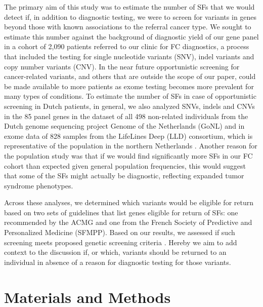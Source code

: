 The primary aim of this study was to estimate the number of SFs that we would detect if, in addition to diagnostic testing, we were to screen for variants in genes beyond those with known associations to the referral cancer type. 
We sought to estimate this number against the background of diagnostic yield of our gene panel in a cohort of 2,090 patients referred to our clinic for FC diagnostics, a process that included the testing for single nucleotide variants (SNV), indel variants and copy number variants (CNV). 
In the near future opportunistic screening for cancer-related variants, and others that are outside the scope of our paper, could be made available to more patients as exome testing becomes more prevalent for many types of conditions. 
To estimate the number of SFs in case of opportunistic screening in Dutch patients, in general, we also analyzed SNVs, indels and CNVs in the 85 panel genes in the dataset of all 498 non-related individuals from the Dutch genome sequencing project Genome of the Netherlands (GoNL) \cite{Francioli_2014} and in exome data of 828 samples from the LifeLines Deep (LLD) consortium, which is representative of the population in the northern Netherlands \cite{Tigchelaar_2015}.
Another reason for the population study was that if we would find significantly more SFs in our FC cohort than expected given general population frequencies, this would suggest that some of the SFs might actually be diagnostic, reflecting expanded tumor syndrome phenotypes.

Across these analyses, we determined which variants would be eligible for return based on two sets of guidelines that list genes eligible for return of SFs: one recommended by the ACMG and one from the French Society of Predictive and Personalized Medicine (SFMPP). 
Based on our results, we assessed if such screening meets proposed genetic screening criteria \cite{Andermann_2008}. 
Hereby we aim to add context to the discussion if, or which, variants should be returned to an individual in absence of a reason for diagnostic testing for those variants. 

\section{Materials and Methods}\label{methods}
